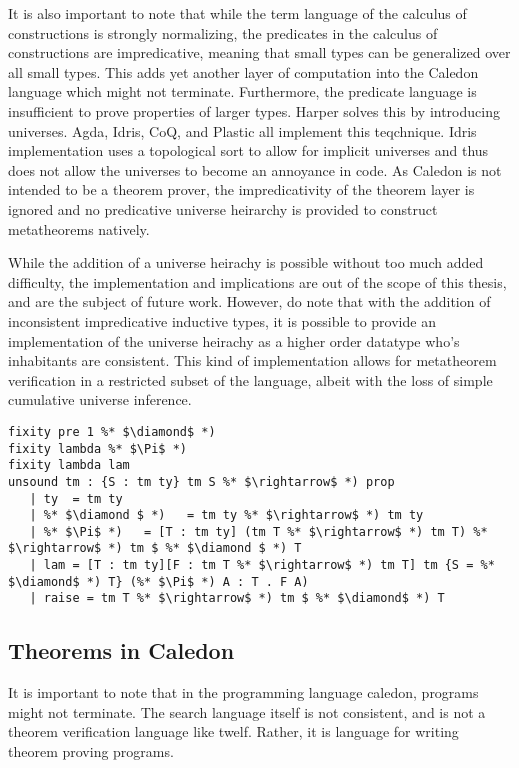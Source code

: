 It is also important to note that while the term language of the calculus of constructions is strongly normalizing, 
the predicates in the calculus of constructions are impredicative, meaning that small types can be generalized over all small types.
This adds yet another layer of computation into the Caledon language which might not terminate.  
Furthermore, the predicate language is insufficient to prove properties of larger types. 
Harper \citep{harper1991type} solves this by introducing universes.  Agda, Idris, CoQ,
and Plastic \citep{callaghan2001implementation} all implement this teqchnique. 
Idris implementation uses a topological sort to allow for implicit universes
and thus does not allow the universes to become an annoyance in code. 
As Caledon is not intended to be a theorem prover, the impredicativity of the theorem layer is ignored and no 
predicative universe heirarchy is provided to construct metatheorems natively.

While the addition of a universe heirachy is possible without too much added difficulty, 
the implementation and implications are out of the scope of this thesis, and are the subject of future work.  
However, do note that with the addition of inconsistent impredicative inductive types, it is possible to provide an implementation 
of the universe heirachy as a higher order datatype who's inhabitants are consistent.  This kind of implementation 
allows for metatheorem verification in a restricted subset of the language, albeit with the loss of 
simple cumulative universe inference.

\begin{lstlisting}
fixity pre 1 %* $\diamond$ *)
fixity lambda %* $\Pi$ *)
fixity lambda lam
unsound tm : {S : tm ty} tm S %* $\rightarrow$ *) prop
   | ty  = tm ty
   | %* $\diamond $ *)   = tm ty %* $\rightarrow$ *) tm ty
   | %* $\Pi$ *)   = [T : tm ty] (tm T %* $\rightarrow$ *) tm T) %* $\rightarrow$ *) tm $ %* $\diamond $ *) T
   | lam = [T : tm ty][F : tm T %* $\rightarrow$ *) tm T] tm {S = %* $\diamond$ *) T} (%* $\Pi$ *) A : T . F A)
   | raise = tm T %* $\rightarrow$ *) tm $ %* $\diamond$ *) T
\end{lstlisting}

\subsection{Theorems in Caledon}

It is important to note that in the programming language caledon, programs might not terminate.  
The search language itself is not consistent, and is not a theorem verification language like twelf.  
Rather, it is language for writing theorem proving programs.  

